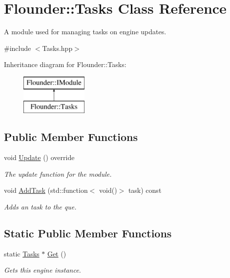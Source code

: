 \hypertarget{class_flounder_1_1_tasks}{}\section{Flounder\+:\+:Tasks Class Reference}
\label{class_flounder_1_1_tasks}


A module used for managing tasks on engine updates.  




{\ttfamily \#include $<$Tasks.\+hpp$>$}

Inheritance diagram for Flounder\+:\+:Tasks\+:\begin{figure}[H]
\begin{center}
\leavevmode
\includegraphics[height=2.000000cm]{class_flounder_1_1_tasks}
\end{center}
\end{figure}
\subsection*{Public Member Functions}
\begin{DoxyCompactItemize}
\item 
void \hyperlink{class_flounder_1_1_tasks_a58e824494498f4a141cf533b44e36761}{Update} () override
\begin{DoxyCompactList}\small\item\em The update function for the module. \end{DoxyCompactList}\item 
void \hyperlink{class_flounder_1_1_tasks_aa646e9127b0a819d7e71d41cf8b82a96}{Add\+Task} (std\+::function$<$ void()$>$ task) const
\begin{DoxyCompactList}\small\item\em Adds an task to the que. \end{DoxyCompactList}\end{DoxyCompactItemize}
\subsection*{Static Public Member Functions}
\begin{DoxyCompactItemize}
\item 
static \hyperlink{class_flounder_1_1_tasks}{Tasks} $\ast$ \hyperlink{class_flounder_1_1_tasks_aebcf542cd24e33bff63fd610961d341f}{Get} ()
\begin{DoxyCompactList}\small\item\em Gets this engine instance. \end{DoxyCompactList}\end{DoxyCompactItemize}
